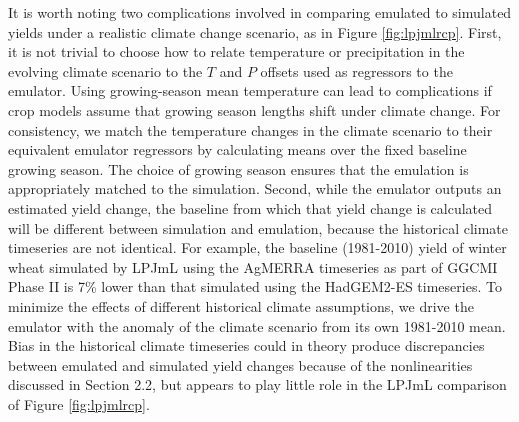 \documentclass[gmd, manuscript]{copernicus} %
\begin{document}
It is worth noting two complications involved in comparing emulated to simulated yields under a realistic climate change scenario, as in Figure \ref{fig:lpjmlrcp}.
First, it is not trivial to choose how to relate temperature or precipitation in the evolving climate scenario to the $T$ and $P$ offsets used as regressors to the emulator. 
Using growing-season mean temperature can lead to complications if crop models assume that growing season lengths shift under climate change. 
For consistency, we match the temperature changes in the climate scenario to their equivalent emulator regressors by calculating means over the fixed baseline growing season. 
The choice of growing season ensures that the emulation is appropriately matched to the simulation.
Second, while the emulator outputs an estimated yield change, the baseline from which that yield change is calculated will be different between simulation and emulation, because the historical climate timeseries are not identical. For example, the baseline (1981-2010) yield of winter wheat simulated by LPJmL using the AgMERRA timeseries as part of GGCMI Phase II is 7\% lower than that simulated using the HadGEM2-ES timeseries. 
To minimize the effects of different historical climate assumptions, we drive the emulator with the anomaly of the climate scenario from its own 1981-2010 mean. 
Bias in the historical climate timeseries could in theory produce discrepancies between emulated and simulated yield changes because of the nonlinearities discussed in Section 2.2, but appears to play little role in the LPJmL comparison of Figure \ref{fig:lpjmlrcp}. 

\end{document}

